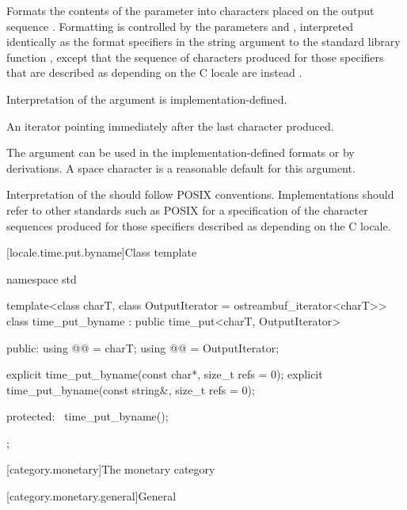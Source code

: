 \begin{itemdescr}
\pnum
\effects
Formats the contents of the parameter 
into characters placed on the output sequence .
Formatting is controlled by the parameters  and ,
interpreted identically as the format specifiers
in the string argument to the standard library function
%
,
except that the sequence of characters produced for those specifiers
that are described as depending on the C locale
are instead
.
\begin{note}
Interpretation of the  argument is implementation-defined.
\end{note}

\pnum
\returns
An iterator pointing immediately after the last character produced.
\begin{note}
The  argument can be used
in the implementation-defined formats or by derivations.
A space character is a reasonable default for this argument.
\end{note}

\pnum
\recommended
Interpretation of the  should follow POSIX conventions.
Implementations should refer to other standards such as POSIX
for a specification of the character sequences produced for
those specifiers described as depending on the C locale.
\end{itemdescr}

[locale.time.put.byname]{Class template }

%
\begin{codeblock}
namespace std {
  template<class charT, class OutputIterator = ostreambuf_iterator<charT>>
  class time_put_byname : public time_put<charT, OutputIterator> {
  public:
    using @@ = charT;
    using @@ = OutputIterator;

    explicit time_put_byname(const char*, size_t refs = 0);
    explicit time_put_byname(const string&, size_t refs = 0);

  protected:
    ~time_put_byname();
  };
}
\end{codeblock}

[category.monetary]{The monetary category}

[category.monetary.general]{General}

